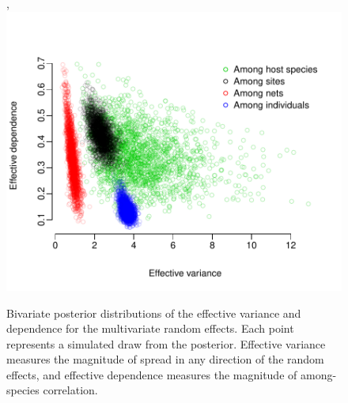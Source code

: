 \begin{figure}[ht]\centering,
\includegraphics[width=\linewidth]{figs/ch4/vardep}
\caption[Bivariate posterior distributions of the effective variance and dependence]{Bivariate posterior distributions of the effective variance and dependence for the multivariate random effects. Each point represents a simulated draw from the posterior. Effective variance measures the magnitude of spread in any direction of the random effects, and effective dependence measures the magnitude of among-species correlation.}
\label{fig:vardep}
\end{figure}
